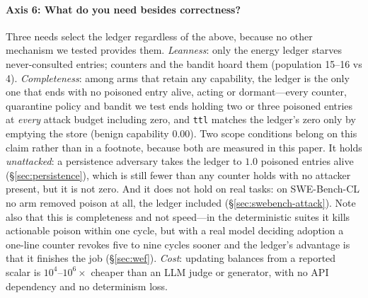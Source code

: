 \paragraph{Axis 6: What do you need besides correctness?}
Three needs select the ledger regardless of the above, because no other
mechanism we tested provides them. \emph{Leanness}: only the energy
ledger starves never-consulted entries; counters and the bandit hoard
them (population 15--16 vs 4). \emph{Completeness}: among arms that
retain any capability, the ledger is the only one that ends with no
poisoned entry alive, acting or dormant---every counter, quarantine
policy and bandit we test ends holding two or three poisoned entries at
\emph{every} attack budget including zero, and \texttt{ttl} matches the
ledger's zero only by emptying the store (benign capability $0.00$). Two
scope conditions belong on this claim rather than in a footnote, because
both are measured in this paper. It holds \emph{unattacked}: a
persistence adversary takes the ledger to $1.0$ poisoned entries alive
(\S\ref{sec:persistence}), which is still fewer than any counter holds
with no attacker present, but it is not zero. And it does not hold on
real tasks: on SWE-Bench-CL no arm removed poison at all, the ledger
included (\S\ref{sec:swebench-attack}). Note also that this is
completeness and not speed---in the deterministic suites it kills
actionable poison within one cycle, but with a real model deciding
adoption a one-line counter revokes five to nine cycles sooner and the
ledger's advantage is that it finishes the job
(\S\ref{sec:wef}). \emph{Cost}: updating balances from a reported scalar is
$10^4$--$10^6\times$ cheaper than an LLM judge or generator, with no API
dependency and no determinism loss.

